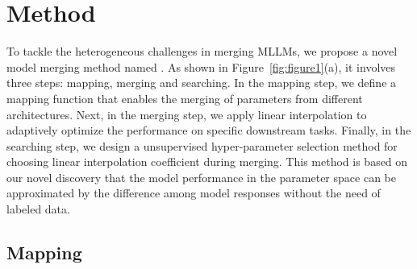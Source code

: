 \section{Method}
\label{sec:method}
To tackle the heterogeneous challenges in merging MLLMs, we propose a novel model merging method named \ours. As shown in Figure~\ref{fig:figure1}(a), it involves three steps: mapping, merging and searching. In the mapping step, we define a mapping function that enables the merging of parameters from different architectures. Next, in the merging step, we apply linear interpolation to adaptively optimize the performance on specific downstream tasks. Finally, in the searching step, we design a unsupervised hyper-parameter selection method for choosing linear interpolation coefficient during merging. This method is based on our novel discovery that the model performance in the parameter space can be approximated by the difference among model responses without the need of labeled data.
\subsection{Mapping} \label{mapping}


